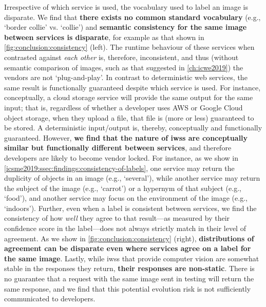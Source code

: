 Irrespective of which service is used, the vocabulary used to label an image is disparate. We find that \textbf{there exists no common standard vocabulary} (e.g., `border collie' vs. `collie') and \textbf{semantic consistency for the same image between services is disparate}, for example as that shown in \cref{fig:conclusion:consistency} (left). The runtime behaviour of these services when contrasted against \textit{each other} is, therefore, inconsistent, and thus (without semantic comparison of images, such as that suggested in \cref{ch:icwe2019}) the vendors are not `plug-and-play'. In contrast to deterministic web services, the same result is functionally guaranteed despite which service is used. For instance, conceptually, a cloud storage service will provide the same output for the same input; that is, regardless of whether a developer uses AWS or Google Cloud object storage, when they upload a file, that file is (more or less) guaranteed to be stored. A deterministic input/output is, thereby, conceptually and functionally guaranteed. However, \textbf{we find that the nature of \glspl{iws} are conceptually similar but functionally different between services}, and therefore developers are likely to become vendor locked. For instance, as we show in \cref{icsme2019:ssec:findings:consistency-of-labels}, one service may return the duplicity of objects in an image (e.g., `several'), while another service may return the subject of the image (e.g., `carrot') or a hypernym of that subject (e.g., `food'), and another service may focus on the environment of the image (e.g., `indoors').
Further, even when a label is consistent between services, we find the consistency of how \textit{well} they agree to that result---as measured by their confidence score in the label---does not always strictly match in their level of agreement. As we show in \cref{fig:conclusion:consistency} (right), \textbf{distributions of agreement can be disparate even where services agree on a label for the same image}.
Lastly, while \glspl{iws} that provide computer vision are somewhat stable in the responses they return, \textbf{their responses are non-static}. There is no guarantee that a request with the same image sent in testing will return the same response, and we find that this potential evolution risk is not sufficiently communicated to developers.

